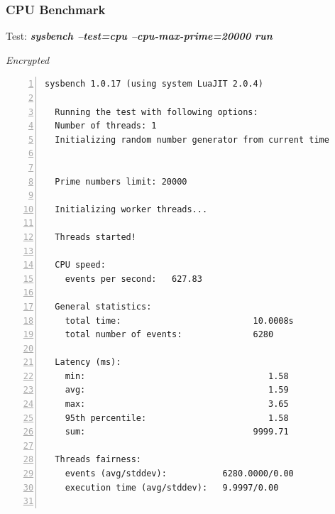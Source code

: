 \subsubsection{CPU Benchmark}
\begin{center}
  Test: \textbf{\textit{sysbench --test=cpu --cpu-max-prime=20000 run}}  
\end{center}
\vspace*{-\baselineskip}
\noindent\begin{minipage}[t]{0.45\linewidth}
  \centering
  \textit{Encrypted}
  \begin{lstlisting}[basicstyle=\tiny,frame=single, numbers=left, label=cpu_test1]
  sysbench 1.0.17 (using system LuaJIT 2.0.4)

  Running the test with following options:
  Number of threads: 1
  Initializing random number generator from current time
  
  
  Prime numbers limit: 20000
  
  Initializing worker threads...
  
  Threads started!
  
  CPU speed:
    events per second:   627.83
  
  General statistics:
    total time:                          10.0008s
    total number of events:              6280
  
  Latency (ms):
    min:                                    1.58
    avg:                                    1.59
    max:                                    3.65
    95th percentile:                        1.58
    sum:                                 9999.71
  
  Threads fairness:
    events (avg/stddev):           6280.0000/0.00
    execution time (avg/stddev):   9.9997/0.00
    
  \end{lstlisting}
\end{minipage}
\hspace{0.5cm}
